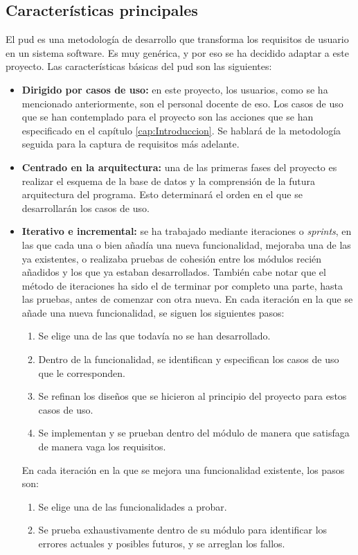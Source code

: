 \subsection{Características principales}
El \gls{pud} es una metodología de desarrollo que transforma los requisitos de usuario en un sistema software. Es muy genérica, y por eso se ha decidido adaptar a este proyecto.
Las características básicas del \gls{pud} son las siguientes:
\begin{itemize}
	\item \textbf{Dirigido por casos de uso:} en este proyecto, los usuarios, como se ha mencionado anteriormente, son el personal docente de \gls{eso}. Los casos de uso que se han contemplado para el proyecto son las acciones que se han especificado en el capítulo \ref{cap:Introduccion}. Se hablará de la metodología seguida para la captura de requisitos más adelante.
	\item \textbf{Centrado en la arquitectura:} una de las primeras fases del proyecto es realizar el esquema de la base de datos y la comprensión de la futura arquitectura del programa. Esto determinará el orden en el que se desarrollarán los casos de uso.
	\item \textbf{Iterativo e incremental:} se ha trabajado mediante iteraciones o \textit{sprints}, en las que cada una o bien añadía una nueva funcionalidad, mejoraba una de las ya existentes, o realizaba pruebas de cohesión entre los módulos recién añadidos y los que ya estaban desarrollados. También cabe notar que el método de iteraciones ha sido el de terminar por completo una parte, hasta las pruebas, antes de comenzar con otra nueva. En cada iteración en la que se añade una nueva funcionalidad, se siguen los siguientes pasos:
	\begin{enumerate}
		\item Se elige una de las que todavía no se han desarrollado.
		\item Dentro de la funcionalidad, se identifican y especifican los casos de uso que le corresponden.
		\item Se refinan los diseños que se hicieron al principio del proyecto para estos casos de uso.
		\item Se implementan y se prueban dentro del módulo de manera que satisfaga de manera vaga los requisitos.
	\end{enumerate}
	
	En cada iteración en la que se mejora una funcionalidad existente, los pasos son:
	\begin{enumerate}
		\item Se elige una de las funcionalidades a probar.
		\item Se prueba exhaustivamente dentro de su módulo para identificar los errores actuales y posibles futuros, y se arreglan los fallos.
	\end{enumerate}
	

\end{itemize}

